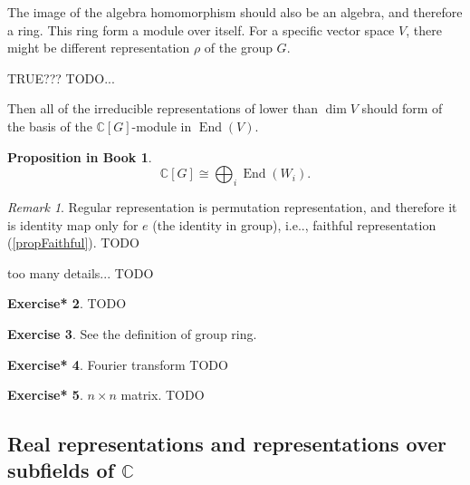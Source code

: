 \documentclass[12pt, letterpaper]{article}
\makeatletter
\newcommand{\co}{\mathbb{C}}
\newcommand{\End}{\operatorname{End}}
\newcommand\ie{i.e\@ifnextchar.{}{.\@}}
\newcommand{\red}[1]{{\color{red} #1}}
\theoremstyle{definition}
\theoremstyle{remark}
\newtheorem*{rem*}{Remark}
\theoremstyle{definition}
\newtheorem{exe}{Exercise}[section]
\newtheorem{exe*}[exe]{Exercise*}
\theoremstyle{plain}
\newtheorem{pprop}[exe]{Proposition in Book}
\numberwithin{equation}{section}
\makeatother
\begin{document}
	The image of the algebra homomorphism should also be an algebra, and therefore a ring.
	This ring form a module over itself.
	For a specific vector space $V$, there might be different representation $\rho$ of the group $G$.
	\red{TRUE??? TODO...
		
		
		 Then all of the irreducible representations of lower than $\dim V$
	should form of the basis of the $\co[G]$-module in $\End(V)$.
	}

	\begin{pprop}
		\[ \co[G]\cong \bigoplus_i\End(W_i).\]
	\end{pprop}
	\begin{rem*}
		Regular representation is permutation representation,
		and therefore it is identity map only for $e$ (the identity in group), \ie, faithful representation (\ref{propFaithful}).
			\red{TODO}
	\end{rem*}

	\red{too many details... TODO}
	
	\begin{exe*}
		\red{TODO}
	\end{exe*}

	\begin{exe}
		See the definition of group ring.
	\end{exe}
	
	\begin{exe*}
		Fourier transform \red{TODO}
	\end{exe*}
	\begin{exe*}
		$n\times n$ matrix. \red{TODO}
	\end{exe*}

	\subsection{Real representations and representations over subfields of $\co$}
	
\end{document}
